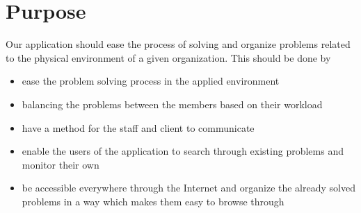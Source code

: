 \section{Purpose}
Our application should ease the process of solving and organize problems related to the physical environment of a given organization. This should be done by
\begin{itemize}
\item ease the problem solving process in the applied environment
\item balancing the problems between the \astaff[] members based on their workload%
\item have a method for the staff and client to communicate
\item enable the users of the application to search through existing problems and monitor their own
\item be accessible everywhere through the Internet and organize the already solved problems in a way which makes them easy to browse through
\end{itemize}